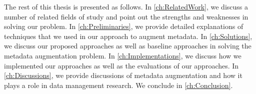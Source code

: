 The rest of this thesis is presented as follows. In \autoref{ch:RelatedWork}, we discuss a number of related fields of study and point out the strengths and weaknesses in solving our problem. In \autoref{ch:Preliminaries}, we provide detailed explanations of techniques that we used in our approach to augment metadata. In \autoref{ch:Solutions}, we discuss our proposed approaches as well as baseline approaches in solving the metadata augmentation problem. In \autoref{ch:Implementations}, we discuss how we implemented our approaches as well as the evaluations of our approaches. In \autoref{ch:Discussions}, we provide discussions of metadata augmentation and how it plays a role in data management research. We conclude in \autoref{ch:Conclusion}.
\endinput